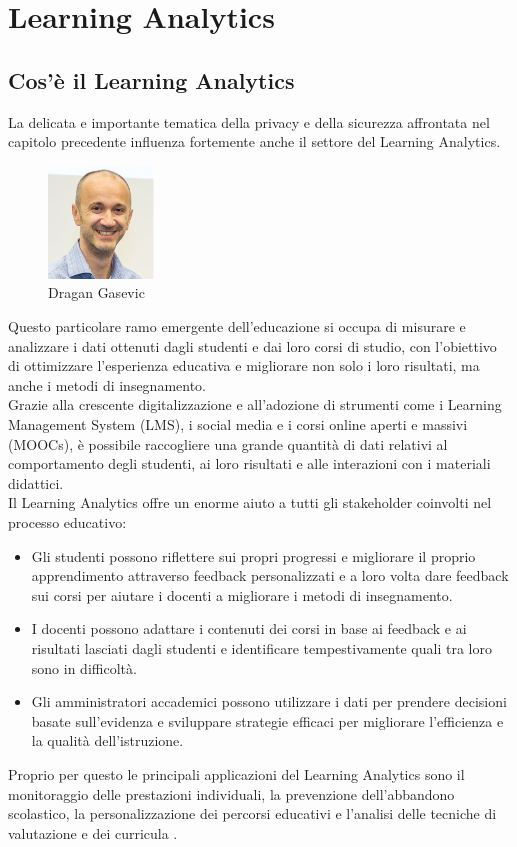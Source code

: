 \chapter{Learning Analytics}
\section{Cos'è il Learning Analytics}
La delicata e importante tematica della privacy e della sicurezza affrontata nel capitolo precedente influenza fortemente anche il settore
del Learning Analytics.
\begin{figure}
    \centering
    \includegraphics[width=0.25\textwidth]{Immagini/Dragan Gasevic.jpg}
    \caption{Dragan Gasevic}
\end{figure}
Questo particolare ramo emergente dell'educazione si occupa di misurare e analizzare i dati ottenuti dagli studenti e dai loro corsi
di studio, con l'obiettivo di ottimizzare l'esperienza educativa e migliorare non solo i loro risultati, ma anche i metodi di insegnamento. 
\\Grazie alla crescente digitalizzazione e all'adozione di strumenti 
come i Learning Management System (LMS), i social media e i corsi online aperti e massivi (MOOCs), è possibile raccogliere una grande quantità di dati relativi al comportamento degli studenti, 
ai loro risultati e alle interazioni con i materiali didattici. 
\\Il Learning Analytics offre un enorme aiuto a tutti gli stakeholder coinvolti nel processo educativo:
\begin{itemize}
    \item Gli studenti possono riflettere sui propri progressi e migliorare il proprio apprendimento attraverso feedback personalizzati e a loro volta dare feedback sui corsi per aiutare i docenti a migliorare i metodi di insegnamento.
    \item I docenti possono adattare i contenuti dei corsi in base ai feedback e ai risultati lasciati dagli studenti e identificare tempestivamente quali tra loro sono in difficoltà.
    \item Gli amministratori accademici possono utilizzare i dati per prendere decisioni basate sull'evidenza e sviluppare strategie efficaci per migliorare l'efficienza e la qualità dell'istruzione.
\end{itemize}
Proprio per questo le principali applicazioni del Learning Analytics sono il monitoraggio delle prestazioni individuali, la prevenzione dell'abbandono scolastico,
la personalizzazione dei percorsi educativi e l'analisi delle tecniche di valutazione e dei curricula \cite{wikipedia_learning_analytics}.

